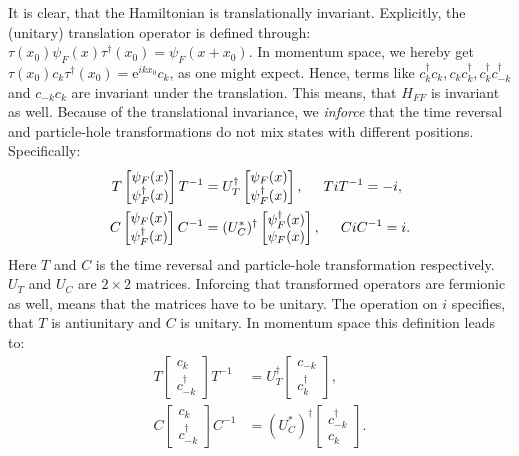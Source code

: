 It is clear, that the Hamiltonian is translationally invariant. Explicitly, the (unitary) translation operator is defined through: $\tau(x_0)\psi_F(x)\tau^\dagger (x_0) = \psi_F(x+x_0)$. In momentum space, we hereby get $\tau(x_0) c_k \tau^\dagger(x_0) = \text{e}^{ikx_0}c_k$, as one might expect. Hence, terms like $c^\dagger_k c_k, c_k c^\dagger_k, c^\dagger_kc^\dagger_{-k}$ and $c_{-k}c_k$ are invariant under the translation. This means, that $H_{FF}$ is invariant as well. Because of the translational invariance, we \textit{inforce} that the time reversal and particle-hole transformations do not mix states with different positions. Specifically:
\begin{align}
T \begin{bmatrix} \psi_F(x) \\ \psi^\dagger_F(x) \end{bmatrix} T^{-1} &= U^\dagger_T \begin{bmatrix} \psi_F(x) \\ \psi^\dagger_F(x) \end{bmatrix}, \hspace{0.5cm} TiT^{-1} = -i, \nonumber \\
C \begin{bmatrix} \psi_F(x) \\ \psi^\dagger_F(x) \end{bmatrix} C^{-1} &= (U^*_C)^\dagger \begin{bmatrix} \psi^\dagger_F(x) \\ \psi_F(x) \end{bmatrix}, \hspace{0.5cm} CiC^{-1} = i.  
\label{eq.TRandPH.realspace}
\end{align}
Here $T$ and $C$ is the time reversal and particle-hole transformation respectively. $U_T$ and $U_C$ are $2\times 2$ matrices. Inforcing that transformed operators are fermionic as well, means that the matrices have to be unitary. The operation on $i$ specifies, that $T$ is antiunitary and $C$ is unitary. In momentum space this definition leads to:
\begin{align}
T \begin{bmatrix} c_k \\ c^\dagger_{-k} \end{bmatrix} T^{-1} &= U^\dagger_T \begin{bmatrix} c_{-k} \\ c^\dagger_{k} \end{bmatrix}, \nonumber \\
C \begin{bmatrix} c_k \\ c^\dagger_{-k} \end{bmatrix} C^{-1} &= (U^*_C)^\dagger \begin{bmatrix} c^\dagger_{-k} \\ c_{k} \end{bmatrix}. 
\label{eq.TRandPH.momentumspace}
\end{align}
